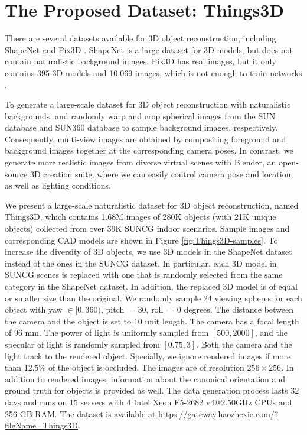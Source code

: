 \documentclass[twocolumn]{svjour3}
\begin{document}
\section{The Proposed Dataset: Things3D}
\label{sec:things3d}

There are several datasets available for 3D object reconstruction, including ShapeNet \citep{DBLP:conf/cvpr/WuSKYZTX15} and Pix3D \citep{DBLP:conf/cvpr/Sun0ZZZXTF18}.
ShapeNet is a large dataset for 3D models, but does not contain naturalistic background images.
Pix3D has real images, but it only contains 395 3D models and 10,069 images, which is not enough to train networks \citep{DBLP:conf/cvpr/TatarchenkoRRLK19}.

To generate a large-scale dataset for 3D object reconstruction with naturalistic backgrounds, \cite{DBLP:conf/iccv/SuQLG15} and \cite{DBLP:conf/cvpr/LinWRSKFL19} randomly warp and crop spherical images from the SUN database \citep{DBLP:conf/cvpr/XiaoHEOT10} and SUN360 database \citep{DBLP:conf/cvpr/XiaoEOT12} to sample background images, respectively.
Consequently, multi-view images are obtained by compositing foreground and background images together at the corresponding camera poses.
In contrast, we generate more realistic images from diverse virtual scenes with Blender, an open-source 3D creation suite, where we can easily control camera pose and location, as well as lighting conditions.

We present a large-scale naturalistic dataset for 3D object reconstruction, named Things3D, which contains 1.68M images of 280K objects (with 21K unique objects) collected from over 39K SUNCG \citep{DBLP:conf/cvpr/SongYZCSF17} indoor scenarios.
Sample images and corresponding CAD models are shown in Figure \ref{fig:Things3D-samples}.
To increase the diversity of 3D objects, we use 3D models in the ShapeNet dataset instead of the ones in the SUNCG dataset.
In particular, each 3D model in SUNCG scenes is replaced with one that is randomly selected from the same category in the ShapeNet dataset.
In addition, the replaced 3D model is of equal or smaller size than the original.
We randomly sample 24 viewing spheres for each object with yaw $\in [0, 360)$, pitch $= 30$, roll $= 0$ degrees.
The distance between the camera and the object is set to 10 unit length.
The camera has a focal length of 96 mm.
The power of light is uniformly sampled from $[500, 2000]$, and the specular of light is randomly sampled from $[0.75, 3]$.
Both the camera and the light track to the rendered object.
Specially, we ignore rendered images if more than 12.5\% of the object is occluded.
The images are of resolution $256 \times 256$.
In addition to rendered images, information about the canonical orientation and ground truth for objects is provided as well.
The data generation process lasts 32 days and runs on 15 servers with 4 Intel Xeon E5-2682 v4@2.50GHz CPUs and 256 GB RAM.
The dataset is available at \url{https://gateway.haozhexie.com/?fileName=Things3D}.
\end{document}
